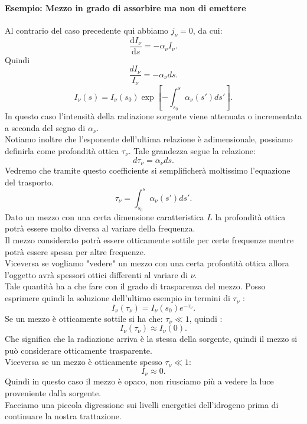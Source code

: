 \paragraph{Esempio: Mezzo in grado di assorbire ma non di emettere}%
Al contrario del caso precedente qui abbiamo $j _{\nu}=0$, da cui: 
\[
	\frac{\mbox{d} I_{\nu}}{\mbox{d} s} = -\alpha_{\nu} I_{\nu}
.\] 
Quindi \[
	\frac{dI_{\nu}}{I_{\nu}}= -\alpha_{\nu}ds
.\] 	
\[
	I_{\nu}\left( s \right) = I_{\nu}\left( s_0 \right) \exp\left[- \int_{s_0}^{s}\alpha_{\nu}\left( s' \right) ds' \right]  
.\] 
In questo caso l'intensità della radiazione sorgente viene attenuata o incrementata a seconda del segno di $\alpha _{\nu} $.\\
Notiamo inoltre che l'esponente dell'ultima relazione è adimensionale, possiamo definirla come profondità ottica $\tau _{\nu} $.
Tale grandezza segue la relazione: 
\[
	d\tau_{\nu}= \alpha_{\nu}ds
.\] 
Vedremo che tramite questo coefficiente si semplificherà moltissimo l'equazione del trasporto.
\[
	\tau_{\nu} = \int_{s_0}^{s} \alpha_{\nu}\left( s' \right) ds'
.\] 
Dato un mezzo con una certa dimensione caratteristica $L$ la profondità ottica potrà essere molto diversa al variare della frequenza.\\
Il mezzo considerato potrà essere otticamente sottile per certe frequenze mentre potrà essere spessa per altre frequenze.\\
Viceversa se vogliamo "vedere" un mezzo con una certa profontità ottica allora l'oggetto avrà spessori ottici differenti al variare di $\nu $.\\
Tale quantità ha a che fare con il grado di trasparenza del mezzo. Posso esprimere quindi la soluzione dell'ultimo esempio in termini di $\tau_{\nu}$ :
\[
	I_{\nu}\left( \tau _{\nu}  \right) = I_{\nu}\left( s_0 \right) e^{-\tau_{\nu}}
.\] 
Se un mezzo è otticamente sottile si ha che: $\tau_{\nu}\ll 1$, quindi :
\[
	I_{\nu}\left( \tau _{\nu}  \right) \approx I_{\nu}\left( 0 \right) 
.\] 
Che significa che la radiazione arriva è la stessa della sorgente, quindi il mezzo si può considerare otticamente trasparente.\\
Viceversa se un mezzo è otticamente spesso $\tau_{\nu}\ll 1$:
\[
	I_{\nu}\approx 0
.\] 
Quindi in questo caso il mezzo è opaco, non riusciamo più a vedere la luce proveniente dalla sorgente.\\
Facciamo una piccola digressione sui livelli energetici dell'idrogeno prima di continuare la nostra trattazione.
